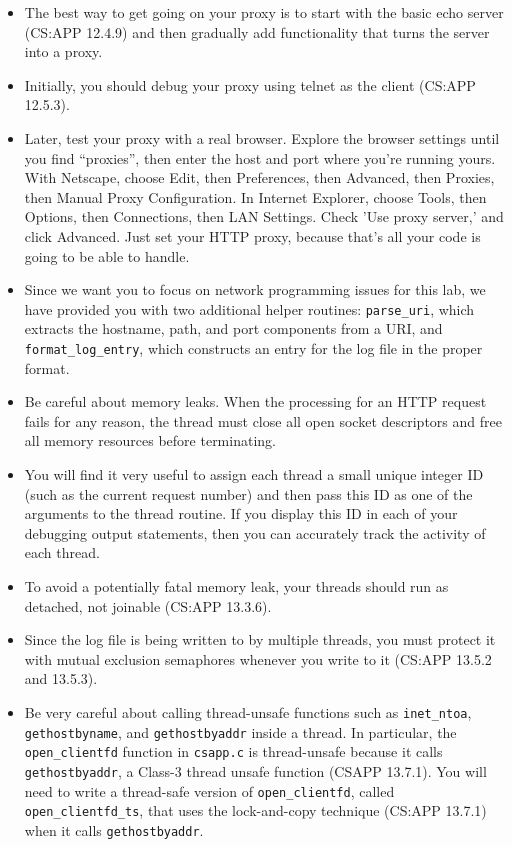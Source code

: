 \documentclass[11pt]{article}
\begin{document}
\begin{itemize}
\item The best way to get going on your proxy is to start with the
basic echo server (CS:APP 12.4.9) and then gradually add
functionality that turns the server into a proxy.

\item Initially, you should debug your proxy using telnet as the client (CS:APP
12.5.3). 

\item Later, test your proxy with a real browser. Explore the browser
settings until you find ``proxies'', then enter the host and port
where you're running yours. With Netscape, choose Edit, then
Preferences, then Advanced, then Proxies, then Manual Proxy
Configuration. In Internet Explorer, choose Tools, then Options,
then Connections, then LAN Settings. Check 'Use proxy server,' and
click Advanced. Just set your HTTP proxy, because that's all your
code is going to be able to handle.

\item Since we want you to focus on network programming issues for this
lab, we have provided you with two additional helper routines:
\texttt{parse\_uri}, which extracts the hostname, path, and port components from
a URI, and \texttt{format\_log\_entry}, which constructs an entry for
the log file in the proper format.

\item Be careful about memory leaks. When the processing for an HTTP
request fails for any reason, the thread must close all open socket
descriptors and free all memory resources before terminating.

\item You will find it very useful to assign each thread a small unique
integer ID (such as the current request number) and then pass this
ID as one of the arguments to the thread routine. If you display
this ID in each of your debugging output statements, then you can
accurately track the activity of each thread.

\item To avoid a potentially fatal memory leak, your threads should run
as detached, not joinable (CS:APP 13.3.6).

\item Since the log file is being written to by multiple threads, you
must protect it with mutual exclusion semaphores whenever you write
to it (CS:APP 13.5.2 and 13.5.3).

\item Be very careful about calling thread-unsafe functions such as
\texttt{inet\_ntoa}, \texttt{gethostbyname}, and \texttt{gethostbyaddr}
inside a thread.  In
particular, the \texttt{open\_clientfd} function in \texttt{csapp.c} 
is thread-unsafe because it calls \texttt{gethostbyaddr}, a Class-3 thread
unsafe function (CSAPP 13.7.1). You will need to write a
thread-safe version of \texttt{open\_clientfd}, called \texttt{open\_clientfd\_ts}, 
that uses the lock-and-copy technique (CS:APP 13.7.1) when it calls
\texttt{gethostbyaddr}.


\end{itemize}
\end{document}
